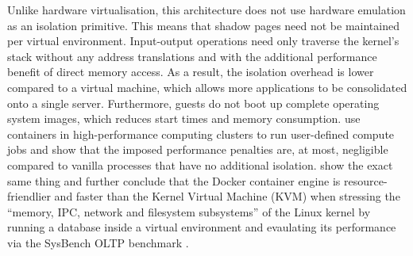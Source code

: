 Unlike hardware virtualisation, this architecture does not use hardware emulation as an 
isolation primitive.
This means that shadow pages need not be maintained per virtual environment. Input-output operations need only 
traverse the kernel's stack without any address translations and with the additional 
performance benefit of direct memory access. As a result, the isolation overhead is lower 
compared to a virtual machine, which allows more applications to be consolidated onto a single server.
Furthermore, guests do not boot up complete operating system images, which reduces 
start times and memory consumption.
\textcite{10.1145/3126908.3126925} use containers in high-performance 
computing clusters to run user-defined compute jobs and show that the imposed performance penalties 
are, at most, negligible compared to vanilla processes that have no additional isolation.
\textcite{7095802} show the exact same thing and further conclude that the Docker container engine 
is resource-friendlier and faster than the Kernel Virtual Machine (KVM) when stressing the
\enquote{memory, IPC, network and filesystem subsystems} \textcite[1]{7095802} of the Linux kernel 
by running a database inside a virtual environment and evaulating its performance via the SysBench OLTP benchmark \cite{sysbench-oltp}.

